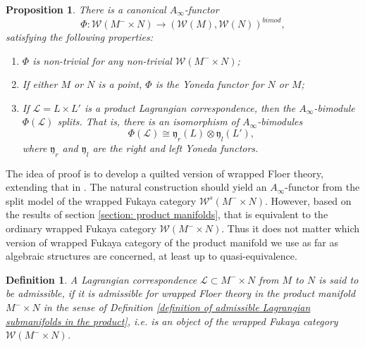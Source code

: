 \documentclass{amsart}
\newtheorem{definition}[theorem]{Definition}
\newtheorem{proposition}[theorem]{Proposition}
\numberwithin{equation}{section}
\numberwithin{figure}{section}
\begin{document}
\begin{proposition}\label{prop: construction of bimodule-valued functor}
	There is a canonical $A_{\infty}$-functor
\begin{equation} \label{bimodule-valued functor}
\Phi: \mathcal{W}(M^{-} \times N) \to (\mathcal{W}(M), \mathcal{W}(N))^{bimod},
\end{equation}
satisfying the following properties:
\begin{enumerate}[label=(\roman*)]

\item $\Phi$ is non-trivial for any non-trivial $\mathcal{W}(M^{-} \times N)$;

\item If either $M$ or $N$ is a point, $\Phi$ is the Yoneda functor for $N$ or $M$;

\item If $\mathcal{L} = L \times L'$ is a product Lagrangian correspondence, then the $A_{\infty}$-bimodule $\Phi(\mathcal{L})$ splits. That is, there is an isomorphism of $A_{\infty}$-bimodules
\begin{equation}
\Phi(\mathcal{L}) \cong \mathfrak{y}_{r}(L) \otimes \mathfrak{y}_{l}(L'),
\end{equation}
where $\mathfrak{y}_{r}$ and $\mathfrak{y}_{l}$ are the right and left Yoneda functors.

\end{enumerate}
\end{proposition}

	The idea of proof is to develop a quilted version of wrapped Floer theory, extending that in \cite{Gao1}. The natural construction should yield an $A_{\infty}$-functor from the split model of the wrapped Fukaya category $\mathcal{W}^{s}(M^{-} \times N)$. However, based on the results of section \ref{section: product manifolds}, that is equivalent to the ordinary wrapped Fukaya category $\mathcal{W}(M^{-} \times N)$. Thus it does not matter which version of wrapped Fukaya category of the product manifold we use as far as algebraic structures are concerned, at least up to quasi-equivalence. \par

\begin{definition}
	A Lagrangian correspondence $\mathcal{L} \subset M^{-} \times N$ from $M$ to $N$ is said to be admissible, if it is admissible for wrapped Floer theory in the product manifold $M^{-} \times N$ in the sense of Definition \ref{definition of admissible Lagrangian submanifolds in the product}, i.e. is an object of the wrapped Fukaya category $\mathcal{W}(M^{-} \times N)$.
\end{definition}
\end{document}
